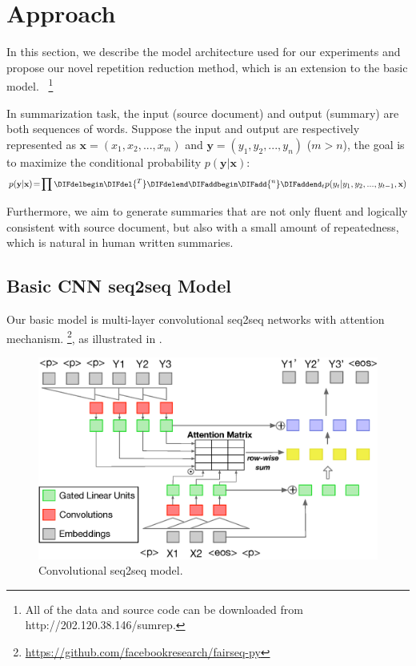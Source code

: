 \section{Approach}
\label{sec:approach}

In this section, we describe the model architecture used for our experiments
and propose our novel repetition reduction method, which is an extension to the basic model.
~\footnote{
All of the data and source code
can be downloaded from http://202.120.38.146/sumrep.}

In summarization task, the input (source document) and
output (summary) are both sequences of words.
Suppose the input and output are respectively represented as
$\textbf{x} = (x_{1},x_{2},...,x_{m})$ and 
$\textbf{y} = (y_{1}, y_{2},..., y_{n})$ ($m>n$),
the goal is to maximize the conditional probability
$p(\textbf{y}|\textbf{x})$:
\begin{equation}
\small
p(\textbf{y} | \textbf{x}) \!=\! {\prod\DIFdelbegin \DIFdel{^T}\DIFdelend \DIFaddbegin \DIFadd{^n}\DIFaddend _{t} {p(y_{t} | y_{1}, y_{2},..., y_{t-1}, \textbf{x}})}
\end{equation}

Furthermore, we aim to generate summaries that are not only fluent 
and logically consistent with source document, but also with 
a small amount of repeatedness, which is natural in human written summaries.  

\subsection{Basic CNN seq2seq Model}
\label{sec:basic}
Our basic model is multi-layer convolutional seq2seq networks \cite{gehring2017convs2s} with attention mechanism.
\footnote{\url{https://github.com/facebookresearch/fairseq-py}}, 
as illustrated in . 

\begin{figure}[th]
    \centering
    \includegraphics[width=0.8\linewidth]{cnn}
    \caption{Convolutional seq2seq model.}
    \label{fig:basicModel}
\end{figure}

